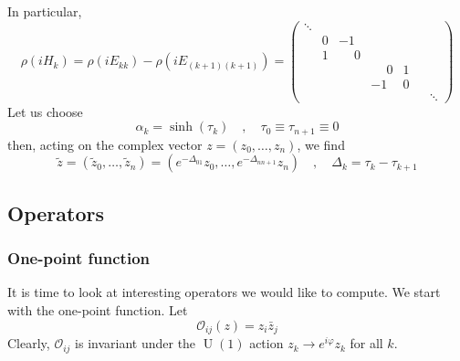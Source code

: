 \documentclass[a4paper,11pt]{article}
\theoremstyle{definition}
\DeclareMathOperator{\U}{U}
\newcommand{\OO}{\mathcal O}
\begin{document}
In particular, 
\begin{equation}
  \rho(iH_k) = \rho(iE_{kk}) - \rho(iE_{(k+1)(k+1)}) = 
  \begin{pmatrix} 
    \ddots & & & &\\
    & 0 & -1 & & & \\
    & 1 & \phantom{-}0 & &\\
    & & & \phantom{-}0 & 1 &\\
    & & & -1 & 0 &\\
    & & & & & & \ddots
  \end{pmatrix}
\end{equation}
Let us choose 
\begin{equation}
  \alpha_k = \sinh(\tau_k) \quad , \quad \tau_0 \equiv \tau_{n+1} \equiv 0
\end{equation}
then, acting on the complex vector $z = (z_0, \dots, z_n)$, we find 
\begin{equation}
  \boxed{
\tilde z = (\tilde z_0, \dots, \tilde z_n) = ( e^{-\Delta_{01}}z_0, \dots, e^{-\Delta_{nn+1}}z_n) \quad , \quad \Delta_k = \tau_k - \tau_{k+1}
}
\end{equation}

\subsection{Operators}
\subsubsection{One-point function}
It is time to look at interesting operators we would like to compute.
We start with the one-point function.
Let 
\begin{equation}
  \OO_{ij}(z) = z_i \bar z_j 
\end{equation}
Clearly, $\OO_{ij}$ is invariant under the $\U(1)$ action $z_k \to e^{i\varphi}z_k$ for all $k$.
\end{document}

